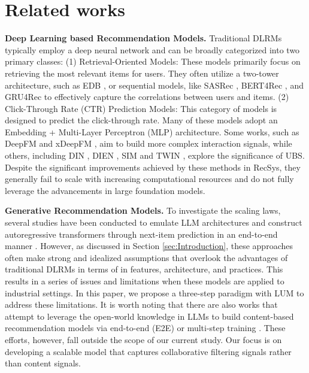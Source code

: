 \section{Related works}
\label{sec:Related works}
\noindent \textbf{Deep Learning based Recommendation Models.}
Traditional DLRMs typically employ a deep neural network and can be broadly categorized into two primary classes:
(1) Retrieval-Oriented Models: These models primarily focus on retrieving the most relevant items for users. 
They often utilize a two-tower architecture, such as EDB \cite{huang2020embedding}, or sequential models, like SASRec \cite{kang2018self}, BERT4Rec \cite{sun2019bert4rec}, and GRU4Rec\cite{hidasi2015session} to effectively capture the correlations between users and items.
(2)
Click-Through Rate (CTR) Prediction Models: This category of models is designed to predict the click-through rate. 
Many of these models adopt an Embedding + Multi-Layer Perceptron (MLP) architecture. 
Some works, such as DeepFM \cite{guo2017deepfm} and xDeepFM \cite{lian2018xdeepfm}, aim to build more complex interaction signals, while others, including DIN \cite{zhou2018deep}, DIEN \cite{zhou2019deep}, SIM \cite{pi2020search} and TWIN \cite{chang2023twin}, explore the significance of UBS.
Despite the significant improvements achieved by these methods in RecSys, they generally fail to scale with increasing computational resources and do not fully leverage the advancements in large foundation models.


\noindent \textbf{Generative Recommendation Models.}
To investigate the scaling laws, several studies have been conducted to emulate LLM architectures and construct autoregressive transformers through next-item prediction in an end-to-end manner \cite{zhai2024actions,geng2022recommendation}. 
However, as discussed in Section \ref{sec:Introduction}, these approaches often make strong and idealized assumptions that overlook the advantages of traditional DLRMs in terms of in features, architecture, and practices. 
This results in a series of issues and limitations when these models are applied to industrial settings.
In this paper, we propose a three-step paradigm with LUM to address these limitations. 
It is worth noting that there are also works that attempt to leverage the open-world knowledge in LLMs to build content-based recommendation models via end-to-end (E2E) or multi-step training \cite{bao2023tallrec, lin2024clickprompt, yu2024ra, chen2024hllm}. These efforts, however, fall outside the scope of our current study. 
Our focus is on developing a scalable model that captures collaborative filtering signals rather than content signals.

\vspace{-1em}